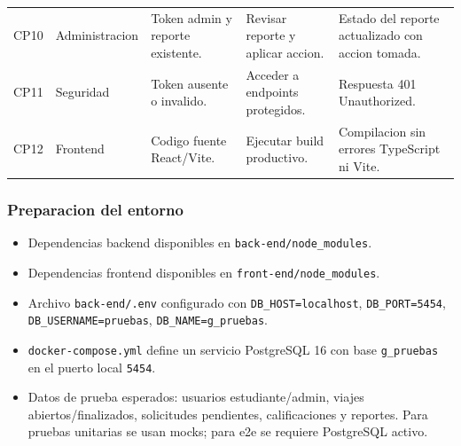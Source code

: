 \documentclass{article}
\begin{document}
\begin{longtable}{p{1.2cm} p{2.2cm} p{3.2cm} p{3.8cm} p{4.0cm}}
    CP10        & Administracion  & Token admin y reporte existente.                            & Revisar reporte y aplicar accion.            & Estado del reporte actualizado con accion tomada.   \\
    CP11        & Seguridad       & Token ausente o invalido.                                   & Acceder a endpoints protegidos.              & Respuesta 401 Unauthorized.                         \\
    CP12        & Frontend        & Codigo fuente React/Vite.                                   & Ejecutar build productivo.                   & Compilacion sin errores TypeScript ni Vite.         \\
    \bottomrule
\end{longtable}

\subsubsection{Preparacion del entorno}
\begin{itemize}[leftmargin=*]
    \item Dependencias backend disponibles en \texttt{back-end/node\_modules}.
    \item Dependencias frontend disponibles en \texttt{front-end/node\_modules}.
    \item Archivo \texttt{back-end/.env} configurado con \texttt{DB\_HOST=localhost}, \texttt{DB\_PORT=5454}, \texttt{DB\_USERNAME=pruebas}, \texttt{DB\_NAME=g\_pruebas}.
    \item \texttt{docker-compose.yml} define un servicio PostgreSQL 16 con base \texttt{g\_pruebas} en el puerto local \texttt{5454}.
    \item Datos de prueba esperados: usuarios estudiante/admin, viajes abiertos/finalizados, solicitudes pendientes, calificaciones y reportes. Para pruebas unitarias se usan mocks; para e2e se requiere PostgreSQL activo.
\end{itemize}
\end{document}
